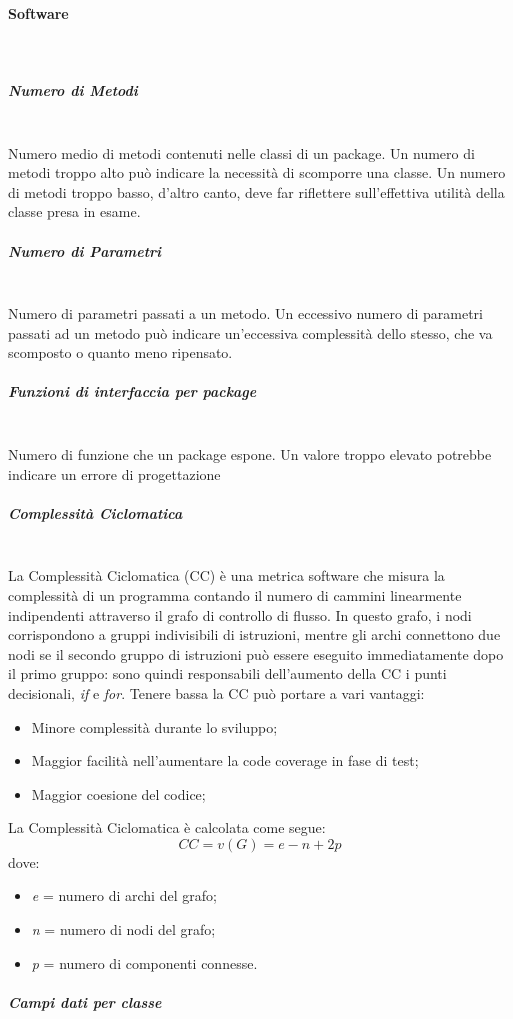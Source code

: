 \paragraph{Software}\mbox{}\\
\subparagraph{Numero di Metodi}\mbox{}\\
Numero medio di metodi contenuti nelle classi di un package. Un numero di metodi troppo alto può indicare la necessità di scomporre una classe. Un numero di metodi troppo basso, d'altro canto, deve far riflettere sull'effettiva utilità della classe presa in esame.
\subparagraph{Numero di Parametri}\mbox{}\\
Numero di parametri passati a un metodo. Un eccessivo numero di parametri passati ad un metodo può indicare un'eccessiva complessità dello stesso, che va scomposto o quanto meno ripensato.
\subparagraph{Funzioni di interfaccia per package}\mbox{}\\
Numero di funzione che un package espone. Un valore troppo elevato potrebbe indicare un errore di progettazione
\subparagraph{Complessità Ciclomatica}\mbox{}\\
La Complessità Ciclomatica (CC) è una metrica software che misura la complessità di un programma contando il numero di cammini linearmente indipendenti attraverso il grafo di controllo di flusso. In questo grafo, i nodi corrispondono a gruppi indivisibili di istruzioni, mentre gli archi connettono due nodi se il secondo gruppo di istruzioni può essere eseguito immediatamente dopo il primo gruppo: sono quindi responsabili dell'aumento della CC i punti decisionali, \emph{if} e \emph{for}.
Tenere bassa la CC può portare a vari vantaggi:
\begin{itemize}
	\item Minore complessità durante lo sviluppo;
	\item Maggior facilità nell'aumentare la code coverage in fase di test;
	\item Maggior coesione del codice;
\end{itemize}
La Complessità Ciclomatica è calcolata come segue:
\[
CC = v(G) = e - n + 2p
\]
dove:
\begin{itemize}
	\item \emph{e} = numero di archi del grafo;
	\item \emph{n} = numero di nodi del grafo;
	\item \emph{p} = numero di componenti connesse.
\end{itemize}
\subparagraph{Campi dati per classe}\mbox{}\\
